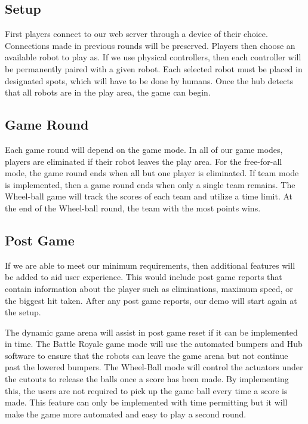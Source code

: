 \documentclass[11pt]{ieeeconf}
\begin{document}
\subsection{Setup}
First players connect to our web server through a device of their choice. Connections made in previous rounds will be preserved. Players then choose an available robot to play as. If we use physical controllers, then each controller will be permanently paired with a given robot. Each selected robot must be placed in designated spots, which will have to be done by humans. Once the hub detects that all robots are in the play area, the game can begin. 

\subsection{Game Round}
Each game round will depend on the game mode. In all of our game modes, players are eliminated if their robot leaves the play area. For the free-for-all mode, the game round ends when all but one player is eliminated. If team mode is implemented, then a game round ends when only a single team remains. The Wheel-ball game will track the scores of each team and utilize a time limit. At the end of the Wheel-ball round, the team with the most points wins.  

\subsection{Post Game}
If we are able to meet our minimum requirements, then additional features will be added to aid user experience. This would include post game reports that contain information about the player such as eliminations, maximum speed, or the biggest hit taken. After any post game reports, our demo will start again at the setup.

The dynamic game arena will assist in post game reset if it can be implemented in time. The Battle Royale game mode will use the automated bumpers and Hub software to ensure that the robots can leave the game arena but not continue past the lowered bumpers. The Wheel-Ball mode will control the actuators under the cutouts to release the balls once a score has been made. By implementing this, the users are not required to pick up the game ball every time a score is made. This feature can only be implemented with time permitting but it will make the game more automated and easy to play a second round. 
\end{document}
